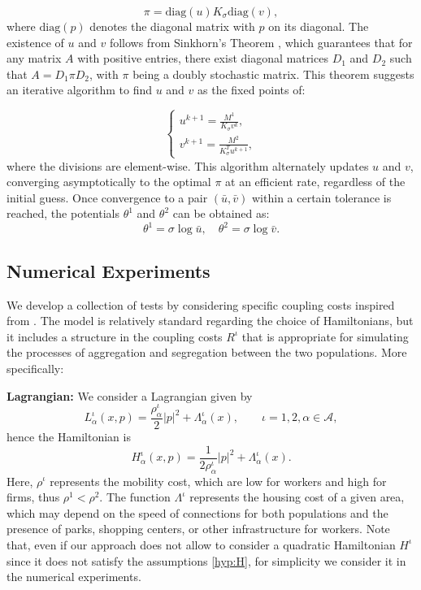 \documentclass[smallextended,referee,envcountsect,]{svjour3}
\newcommand{\cA}{{\mathcal A}}
\begin{document}
\[
\pi = \text{diag}(u) K_\sigma \text{diag}(v),
\]
where \(\text{diag}(p)\) denotes the diagonal matrix with \(p\) on its diagonal. The existence of \(u\) and \(v\) follows from Sinkhorn's Theorem \cite{Sinkhorn}, which guarantees that for any matrix \(A\) with positive entries, there exist diagonal matrices \(D_1\) and \(D_2\) such that \(A = D_1 \pi D_2\), with \(\pi\) being a doubly stochastic matrix. This theorem suggests an iterative algorithm to find \(u\) and \(v\) as the fixed points of:

$$
\left\{
\begin{array}{l}
u^{k+1} = \frac{M^1}{K_\sigma v^k}, \\
v^{k+1} = \frac{M^2}{K_\sigma^T u^{k+1}},
\end{array}
\right.
$$
where the divisions are element-wise. This algorithm alternately updates \(u\) and \(v\), converging asymptotically to the optimal \(\pi\) at an efficient rate, regardless of the initial guess. Once convergence to a pair \((\bar{u}, \bar{v})\) within a certain tolerance is reached, the potentials \(\theta^1\) and \(\theta^2\) can be obtained as:
$$
\theta^1 = \sigma \log \bar{u}, \quad \theta^2 = \sigma \log \bar{v}.
$$

\subsection{Numerical Experiments}
We develop a collection of tests by considering specific coupling costs inspired from \cite{abc}. The model is relatively standard regarding the choice of Hamiltonians, but it includes a structure in the coupling costs $R^\iota$ that is appropriate for simulating the processes of aggregation and segregation between the two populations. More specifically:

\par\medskip\noindent
\textbf{Lagrangian:} We consider a Lagrangian given by
$$
L^\iota_\alpha(x, p) = \frac{\rho^\iota_\alpha}{2}|p|^2 + \Lambda^\iota_\alpha(x), \qquad \iota=1,2, \alpha \in \cA,
$$
hence the Hamiltonian is 
$$
H^\iota_\alpha(x, p) = \frac{1}{2\rho^\iota_\alpha}|p|^2 + \Lambda^\iota_\alpha(x).
$$
Here, $\rho^\iota$ represents the mobility cost, which are low for workers and high for firms, thus $\rho^1 < \rho^2$. The function $\Lambda^\iota$ represents the housing cost of a given area, which may depend on the speed of connections for both populations and the presence of parks, shopping centers, or other infrastructure for workers. Note that, even if our approach does not allow to consider a quadratic Hamiltonian $H^\iota$ since  it does not satisfy the  assumptions   \eqref{hyp:H}, for simplicity we consider it in the numerical experiments.
\end{document}

